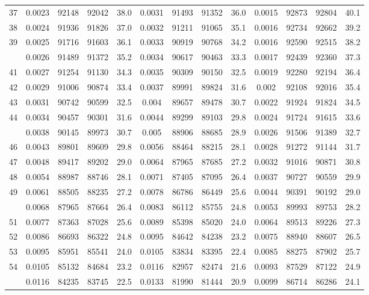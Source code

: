 \documentclass[
  14pt,
]{article}
\begin{document}
\begin{longtable}[t]{lcccccccccccc}
37 & 0.0023 & 92148 & 92042 & 38.0 & 0.0031 & 91493 & 91352 & 36.0 & 0.0015 & 92873 & 92804 & 40.1\\
38 & 0.0024 & 91936 & 91826 & 37.0 & 0.0032 & 91211 & 91065 & 35.1 & 0.0016 & 92734 & 92662 & 39.2\\
39 & 0.0025 & 91716 & 91603 & 36.1 & 0.0033 & 90919 & 90768 & 34.2 & 0.0016 & 92590 & 92515 & 38.2\\
\addlinespace
40 & 0.0026 & 91489 & 91372 & 35.2 & 0.0034 & 90617 & 90463 & 33.3 & 0.0017 & 92439 & 92360 & 37.3\\
41 & 0.0027 & 91254 & 91130 & 34.3 & 0.0035 & 90309 & 90150 & 32.5 & 0.0019 & 92280 & 92194 & 36.4\\
42 & 0.0029 & 91006 & 90874 & 33.4 & 0.0037 & 89991 & 89824 & 31.6 & 0.002 & 92108 & 92016 & 35.4\\
43 & 0.0031 & 90742 & 90599 & 32.5 & 0.004 & 89657 & 89478 & 30.7 & 0.0022 & 91924 & 91824 & 34.5\\
44 & 0.0034 & 90457 & 90301 & 31.6 & 0.0044 & 89299 & 89103 & 29.8 & 0.0024 & 91724 & 91615 & 33.6\\
\addlinespace
45 & 0.0038 & 90145 & 89973 & 30.7 & 0.005 & 88906 & 88685 & 28.9 & 0.0026 & 91506 & 91389 & 32.7\\
46 & 0.0043 & 89801 & 89609 & 29.8 & 0.0056 & 88464 & 88215 & 28.1 & 0.0028 & 91272 & 91144 & 31.7\\
47 & 0.0048 & 89417 & 89202 & 29.0 & 0.0064 & 87965 & 87685 & 27.2 & 0.0032 & 91016 & 90871 & 30.8\\
48 & 0.0054 & 88987 & 88746 & 28.1 & 0.0071 & 87405 & 87095 & 26.4 & 0.0037 & 90727 & 90559 & 29.9\\
49 & 0.0061 & 88505 & 88235 & 27.2 & 0.0078 & 86786 & 86449 & 25.6 & 0.0044 & 90391 & 90192 & 29.0\\
\addlinespace
50 & 0.0068 & 87965 & 87664 & 26.4 & 0.0083 & 86112 & 85755 & 24.8 & 0.0053 & 89993 & 89753 & 28.2\\
51 & 0.0077 & 87363 & 87028 & 25.6 & 0.0089 & 85398 & 85020 & 24.0 & 0.0064 & 89513 & 89226 & 27.3\\
52 & 0.0086 & 86693 & 86322 & 24.8 & 0.0095 & 84642 & 84238 & 23.2 & 0.0075 & 88940 & 88607 & 26.5\\
53 & 0.0095 & 85951 & 85541 & 24.0 & 0.0105 & 83834 & 83395 & 22.4 & 0.0085 & 88275 & 87902 & 25.7\\
54 & 0.0105 & 85132 & 84684 & 23.2 & 0.0116 & 82957 & 82474 & 21.6 & 0.0093 & 87529 & 87122 & 24.9\\
\addlinespace
55 & 0.0116 & 84235 & 83745 & 22.5 & 0.0133 & 81990 & 81444 & 20.9 & 0.0099 & 86714 & 86286 & 24.1\\

\end{longtable}
\end{document}
